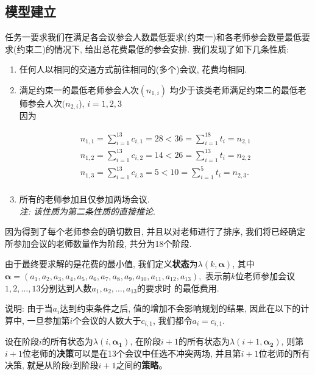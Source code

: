 \subsection{模型建立}
    任务一要求我们在满足各会议参会人数最低要求(约束一)和各老师参会数量最低要求(约束二)的情况下,
    给出总花费最低的参会安排.
    我们发现了如下几条性质:
    \begin{enumerate}
        \item 任何人以相同的交通方式前往相同的(多个)会议, 花费均相同.
        \item 满足约束一的最低老师参会人次$(n_{1,i})$
                均少于该类老师满足约束二的最低老师参会人次$(n_{2,i}$),
                $i=1,2,3$\\
                因为
                
                \begin{gather*}
                    n_{1,1}=\sum_{i=1}^{13} c_{i,1}=28<36=\sum_{i=1}^{18} t_{i}=n_{2,1}\\
                    n_{1,2}=\sum_{i=1}^{13} c_{i,2}=14<26=\sum_{i=1}^{13} t_{i}=n_{2,2}\\
                    n_{1,3}=\sum_{i=1}^{13} c_{i,3}=5 <10=\sum_{i=1}^{ 5} t_{i}=n_{2,3}.\\
                \end{gather*}
        \item 所有的老师参加且仅参加两场会议.\\
                {\itshape 注: 该性质为第二条性质的直接推论}.
    \end{enumerate}

    因为得到了每个老师参会的确切数目, 并且以对老师进行了排序,
    我们将已经确定所参加会议的老师数量作为阶段, 共分为18个阶段.

    由于最终要求解的是花费的最小值, 我们定义\textbf{状态}为$\lambda(k,\boldsymbol{\alpha})$,
    其中
    $\boldsymbol{\alpha}=(a_{1}, a_{2}, a_{3}, a_{4}, a_{5}, a_{6},
    a_{7}, a_{8}, a_{9}, a_{10}, a_{11}, a_{12}, a_{13}),$
    表示前$k$位老师参加会议$1, 2, \dotsc, 13$分别达到人数$a_{1}, a_{2}, \dotsc, a_{13}$的要求时
    的最低费用.

    说明: 由于当$a_{i}$达到约束条件之后, 值的增加不会影响规划的结果,
    因此在以下的计算中, 一旦参加第$i$个会议的人数大于$c_{i, 1}$, 我们都令$a_{i}=c_{i, 1}$.

    设在阶段$i$的所有状态为$\lambda(i, \boldsymbol{\alpha_{1}})$,
    在阶段$i+1$的所有状态为$\lambda(i+1, \boldsymbol{\alpha_{2}})$,
    则第$i+1$位老师的\textbf{决策}可以是在13个会议中任选不冲突两场,
    并且第$i+1$位老师的所有决策, 就是从阶段$i$到阶段$i+1$之间的\textbf{策略}。

